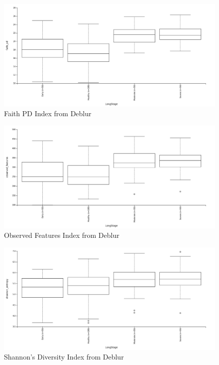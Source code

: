 \documentclass[a4paper]{article}
\begin{document}
            \begin{figure}[p]
                \centering
                \includegraphics[width=0.8 \linewidth]{figures/AlphaDiversity/Deblur/faith.png}
                \caption{Faith PD Index from Deblur}
                \label{fig:faith-deblur}
            \end{figure}

            \begin{figure}[p]
                \centering
                \includegraphics[width=0.8 \linewidth]{figures/AlphaDiversity/Deblur/observed.png}
                \caption{Observed Features Index from Deblur}
                \label{fig:observed-deblur}
            \end{figure}

            \begin{figure}[p]
                \centering
                \includegraphics[width=0.8 \linewidth]{figures/AlphaDiversity/Deblur/shannon.png}
                \caption{Shannon's Diversity Index from Deblur}
                \label{fig:shannon-deblur}
            \end{figure}
\end{document}
